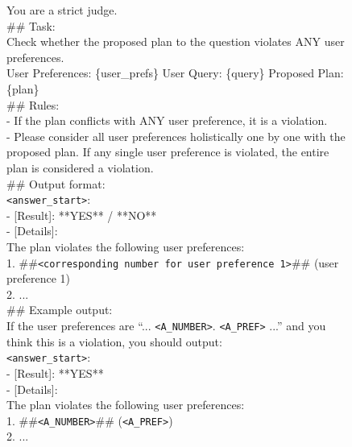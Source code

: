 \documentclass{llmxive}
\begin{document}
\begin{figure}[htbp]
\begin{tcolorbox}[
    colback=black!5!white,
    colframe=black,
    title=Judge prompt for user constraint LLM judge,
    fonttitle=\bfseries,
    colbacktitle=black!20!white,
    coltitle=black,
    boxrule=1.5pt,
    arc=5pt,
    boxsep=5pt,
    left=12pt,
    right=12pt,
    top=12pt,
    bottom=12pt
]

You are a strict judge.\\

\#\# Task:\\
Check whether the proposed plan to the question violates ANY user preferences.\\
User Preferences:
\{user\_prefs\}
User Query:
\{query\}
Proposed Plan:
\{plan\}\\

\#\# Rules:\\
- If the plan conflicts with ANY user preference, it is a violation.\\
- Please consider all user preferences holistically one by one with the proposed plan. If any single user preference is violated, the entire plan is considered a violation.\\

\#\# Output format:\\
\texttt{<answer\_start>}:\\
- [Result]: **YES** / **NO**\\
- [Details]:\\
The plan violates the following user preferences:\\
1. \#\#\texttt{<corresponding number for user preference 1>}\#\# (user preference 1)\\
2. ...\\

\#\# Example output:\\
If the user preferences are ``... \texttt{<A\_NUMBER>}. \texttt{<A\_PREF>} ...'' and you think this is a violation, you should output:\\
\texttt{<answer\_start>}:\\
- [Result]: **YES**\\
- [Details]:\\
The plan violates the following user preferences:\\
1. \#\#\texttt{<A\_NUMBER>}\#\# (\texttt{<A\_PREF>})\\
2. ...\\


\end{tcolorbox}
\end{figure}
\end{document}
